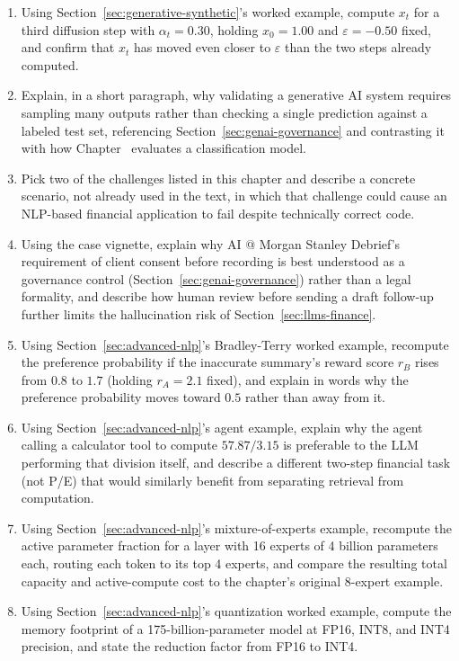 \documentclass[../ai_in_finance]{subfiles}
\begin{document}
\begin{enumerate}[exercises]
    \item Using Section~\ref{sec:generative-synthetic}'s worked example, compute $x_t$ for a third diffusion step with $\alpha_t = 0.30$, holding $x_0 = 1.00$ and $\varepsilon = -0.50$ fixed, and confirm that $x_t$ has moved even closer to $\varepsilon$
     than the two steps already computed.
    \item Explain, in a short paragraph, why validating a generative AI system requires sampling many outputs rather than checking a single prediction against a labeled test set, referencing Section~\ref{sec:genai-governance} and contrasting it with how Chapter~ evaluates a classification model.
    \item Pick two of the challenges listed in this chapter and describe a concrete scenario, not already used in the text, in which that challenge could cause an NLP-based financial application to fail despite technically correct code.
    \item Using the case vignette, explain why AI @ Morgan Stanley Debrief's requirement of client consent before recording is best understood as a governance control (Section~\ref{sec:genai-governance}) rather than a legal formality, and describe how human review before sending a draft follow-up further limits the hallucination risk of Section~\ref{sec:llms-finance}.
    \item Using Section~\ref{sec:advanced-nlp}'s Bradley-Terry worked example, recompute the preference probability if the inaccurate summary's reward score $r_B$ rises from $0.8$ to $1.7$ (holding $r_A = 2.1$ fixed), and explain in words why the preference probability moves toward $0.5$ rather than away from it.
    \item Using Section~\ref{sec:advanced-nlp}'s agent example, explain why the agent calling a calculator tool to compute $57.87/3.15$ is preferable to the LLM performing that division itself, and describe a different two-step financial task (not P/E) that would similarly benefit from separating retrieval from computation.
    \item Using Section~\ref{sec:advanced-nlp}'s mixture-of-experts example, recompute the active parameter fraction for a layer with 16 experts of 4 billion parameters each, routing each token to its top 4 experts, and compare the resulting total capacity and active-compute cost to the chapter's original 8-expert example.
    \item Using Section~\ref{sec:advanced-nlp}'s quantization worked example, compute the memory footprint of a 175-billion-parameter model at FP16, INT8, and INT4 precision, and state the reduction factor from FP16 to INT4.

\end{enumerate}
\end{document}
